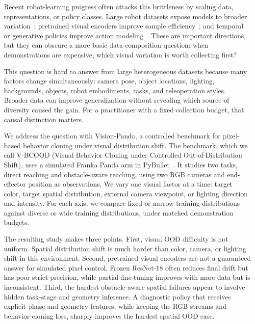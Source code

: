 \documentclass[10pt,twocolumn,letterpaper]{article}
\newcommand{\method}{Vision-Panda}
\newcommand{\benchmark}{V-BCOOD}
\begin{document}
Recent robot-learning progress often attacks this brittleness by scaling data, representations, or policy classes. Large robot datasets expose models to broader variation~\cite{walke2023bridge,khazatsky2024droid,brohan2023rt1}; pretrained visual encoders improve sample efficiency~\cite{nair2023r3m,seo2023mwm}; and temporal or generative policies improve action modeling~\cite{zhao2023act,chi2023diffusion}. These are important directions, but they can obscure a more basic data-composition question: when demonstrations are expensive, which visual variation is worth collecting first?

This question is hard to answer from large heterogeneous datasets because many factors change simultaneously: camera pose, object locations, lighting, backgrounds, objects, robot embodiments, tasks, and teleoperation styles. Broader data can improve generalization without revealing which source of diversity caused the gain. For a practitioner with a fixed collection budget, that causal distinction matters.

We address the question with \method{}, a controlled benchmark for pixel-based behavior cloning under visual distribution shift. The benchmark, which we call \benchmark{} (Visual Behavior Cloning under Controlled Out-of-Distribution Shift), uses a simulated Franka Panda arm in PyBullet~\cite{coumans2021pybullet}. It studies two tasks, direct reaching and obstacle-aware reaching, using two RGB cameras and end-effector position as observations. We vary one visual factor at a time: target color, target spatial distribution, external camera viewpoint, or lighting direction and intensity. For each axis, we compare fixed or narrow training distributions against diverse or wide training distributions, under matched demonstration budgets.

The resulting study makes three points. First, visual OOD difficulty is not uniform. Spatial distribution shift is much harder than color, camera, or lighting shift in this environment. Second, pretrained visual encoders are not a guaranteed answer for simulated pixel control. Frozen ResNet-18 often reduces final drift but has poor strict precision, while partial fine-tuning improves with more data but is inconsistent. Third, the hardest obstacle-aware spatial failures appear to involve hidden task-stage and geometry inference. A diagnostic policy that receives explicit phase and geometry features, while keeping the RGB streams and behavior-cloning loss, sharply improves the hardest spatial OOD case.
\end{document}
